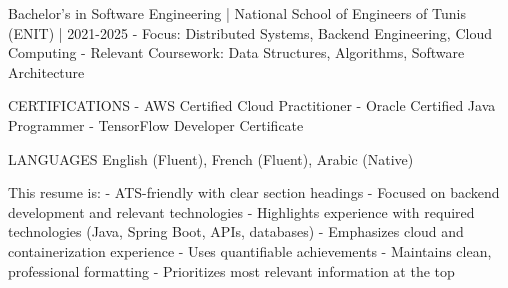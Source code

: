 Bachelor's in Software Engineering | National School of Engineers of Tunis (ENIT) | 2021-2025
- Focus: Distributed Systems, Backend Engineering, Cloud Computing
- Relevant Coursework: Data Structures, Algorithms, Software Architecture

CERTIFICATIONS
- AWS Certified Cloud Practitioner
- Oracle Certified Java Programmer
- TensorFlow Developer Certificate

LANGUAGES
English (Fluent), French (Fluent), Arabic (Native)

This resume is:
- ATS-friendly with clear section headings
- Focused on backend development and relevant technologies
- Highlights experience with required technologies (Java, Spring Boot, APIs, databases)
- Emphasizes cloud and containerization experience
- Uses quantifiable achievements
- Maintains clean, professional formatting
- Prioritizes most relevant information at the top